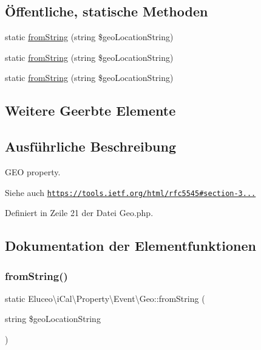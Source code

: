 \subsection*{Öffentliche, statische Methoden}
\begin{DoxyCompactItemize}
\item 
static \mbox{\hyperlink{class_eluceo_1_1i_cal_1_1_property_1_1_event_1_1_geo_a8610d5433703bb05b2f1e48a44b93a81}{from\+String}} (string \$geo\+Location\+String)
\item 
static \mbox{\hyperlink{class_eluceo_1_1i_cal_1_1_property_1_1_event_1_1_geo_a8610d5433703bb05b2f1e48a44b93a81}{from\+String}} (string \$geo\+Location\+String)
\item 
static \mbox{\hyperlink{class_eluceo_1_1i_cal_1_1_property_1_1_event_1_1_geo_a8610d5433703bb05b2f1e48a44b93a81}{from\+String}} (string \$geo\+Location\+String)
\end{DoxyCompactItemize}
\subsection*{Weitere Geerbte Elemente}


\subsection{Ausführliche Beschreibung}
G\+EO property.

\begin{DoxySeeAlso}{Siehe auch}
\href{https://tools.ietf.org/html/rfc5545#section-3.8.1.6}{\tt https\+://tools.\+ietf.\+org/html/rfc5545\#section-\/3...} 
\end{DoxySeeAlso}


Definiert in Zeile 21 der Datei Geo.\+php.



\subsection{Dokumentation der Elementfunktionen}
\mbox{\label{class_eluceo_1_1i_cal_1_1_property_1_1_event_1_1_geo_a8610d5433703bb05b2f1e48a44b93a81}} 
\subsubsection{\texorpdfstring{from\+String()}{fromString()}\hspace{0.1cm}{\footnotesize\ttfamily [1/3]}}
{\footnotesize\ttfamily static Eluceo\textbackslash{}i\+Cal\textbackslash{}\+Property\textbackslash{}\+Event\textbackslash{}\+Geo\+::from\+String (\begin{DoxyParamCaption}\item[{string}]{\$geo\+Location\+String }\end{DoxyParamCaption})\hspace{0.3cm}{\ttfamily [static]}}

